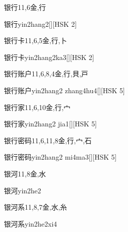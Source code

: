 \begin{Entry}{银行}{11,6}{⾦,⾏}
  \begin{Phonetics}{银行}{yin2hang2}[][HSK 2]
  \end{Phonetics}
\end{Entry}

\begin{Entry}{银行卡}{11,6,5}{⾦,⾏,⼘}
  \begin{Phonetics}{银行卡}{yin2hang2ka3}[][HSK 2]
  \end{Phonetics}
\end{Entry}

\begin{Entry}{银行账户}{11,6,8,4}{⾦,⾏,⾙,⼾}
  \begin{Phonetics}{银行账户}{yin2hang2 zhang4hu4}[][HSK 5]
  \end{Phonetics}
\end{Entry}

\begin{Entry}{银行家}{11,6,10}{⾦,⾏,⼧}
  \begin{Phonetics}{银行家}{yin2hang2 jia1}[][HSK 5]
  \end{Phonetics}
\end{Entry}

\begin{Entry}{银行密码}{11,6,11,8}{⾦,⾏,⼧,⽯}
  \begin{Phonetics}{银行密码}{yin2hang2 mi4ma3}[][HSK 5]
  \end{Phonetics}
\end{Entry}

\begin{Entry}{银河}{11,8}{⾦,⽔}
  \begin{Phonetics}{银河}{yin2he2}
  \end{Phonetics}
\end{Entry}

\begin{Entry}{银河系}{11,8,7}{⾦,⽔,⽷}
  \begin{Phonetics}{银河系}{yin2he2xi4}
  \end{Phonetics}
\end{Entry}

